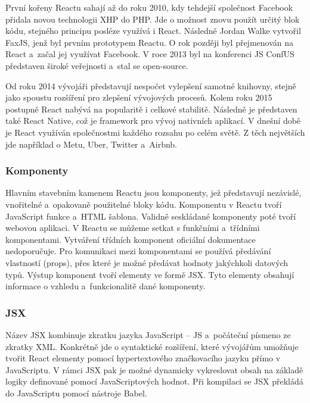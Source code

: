 První kořeny Reactu sahají až do roku 2010, kdy tehdejší společnost Facebook přidala novou technologii XHP do PHP. 
Jde o možnost znovu použít určitý blok kódu, stejného principu posléze využívá i React. Následně Jordan Walke vytvořil FaxJS, jenž byl prvním prototypem Reactu.
O rok později byl přejmenován na React a~začal jej využívat Facebook. 
V roce 2013 byl na konferenci JS ConfUS představen široké veřejnosti a~stal se open-source.

Od roku 2014 vývojáři představují nespočet vylepšení samotné knihovny, stejně jako spoustu rozšíření pro zlepšení vývojových procesů. 
Kolem roku 2015 postupně React nabývá na popularitě i celkové stabilitě. Následně je představen také React Native, což je framework pro vývoj nativních aplikací.
V dnešní době je React využíván společnostmi každého rozsahu po celém světě. 
Z těch největších jde například o Metu, Uber, Twitter a~Airbnb.\cite{reactbanks,reactrisingstack}

\subsubsection{Komponenty}

Hlavním stavebním kamenem Reactu jsou komponenty, jež představují nezávislé, vnořitelné a~opakovaně použitelné bloky kódu. 
Komponentu v Reactu tvoří JavaScript funkce a~HTML šablona. Validně seskládané komponenty poté tvoří webovou aplikaci.
V Reactu se můžeme setkat s funkčními a~třídními komponentami. Vytváření třídních komponent oficiální dokumentace nedoporučuje.
Pro komunikaci mezi komponentami se používá předávání vlastností (props), přes které je možné předávat hodnoty jakýchkoli datových typů.
Výstup komponent tvoří elementy ve formě JSX. Tyto elementy obsahují informace o vzhledu a~funkcionalitě dané komponenty.\cite{reactbanks,react}

\subsubsection{JSX}

Název JSX kombinuje zkratku jazyka JavaScript -- JS a~počáteční písmeno ze zkratky XML. 
Konkrétně jde o syntaktické rozšíření, které vývojářům umožňuje tvořit React elementy pomocí hypertextového značkovacího jazyku přímo v JavaScriptu. 
V rámci JSX pak je možné dynamicky vykreslovat obsah na základě logiky definované pomocí JavaScriptových hodnot.
Při kompilaci se JSX překládá do JavaScriptu pomocí nástroje Babel.\cite{reactbanks,react}


